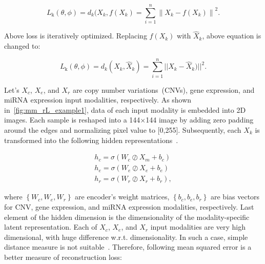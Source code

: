 \begin{equation}
    L_{\mathrm{k}}(\theta, \phi)=\text{$d_{k}$}(X_{k}, f(X_{k}) = \sum_{i=1}^{n} \left\|X_{k}-f(X_{k})\right\|^{2}.
\end{equation}

\hspace*{3.5mm} Above loss is iteratively optimized. Replacing $f(X_{k})$ with $\hat{X}_{k}$, above equation is changed to: 

\begin{equation}
    L_{\mathrm{k}}(\theta, \phi)=\text{$d_{k}$}(X_{k}, \hat{X}_{k}) = \sum_{i=1}^{n} ||X_{k}-\hat{X}_{k})||^{2}.
\end{equation}

\hspace*{3.5mm} Let's $X_c$, $X_e$, and $X_r$ are copy number variations~(CNVs), gene expression, and miRNA expression input modalities, respectively. As shown in~\cref{fig:mm_rL_example1}, data of each input modality is embedded into 2D images. Each sample is reshaped into a 144$\times$144 image by adding zero padding around the edges and normalizing pixel value to [0,255]. Subsequently, each $X_k$ is transformed into the following hidden representations~\cite{KarimIEEEAccess2019}.

\begin{equation}
    \begin{array}{l}
        {h_{c}=\sigma \left(W_{c} \oslash X_{m}+b_{c}\right)} \\
        {h_{e}=\sigma \left(W_{e} \oslash X_{e}+b_{e}\right)} \\
        {h_{r}=\sigma \left(W_{r} \oslash X_{r}+b_{r}\right),}
    \end{array}
\end{equation}  

\hspace*{3.5mm} where $\left\{W_{c}, W_{e}, W_{r}\right\}$ are encoder's weight matrices, $\left\{b_{c}, b_{e}, b_{r}\right\}$ are bias vectors for CNV, gene expression, and miRNA expression modalities, respectively. Last element of the hidden dimension is the dimensionality of the modality-specific latent representation. Each of $X_c$, $X_e$, and $X_r$ input modalities are very high dimensional, with huge difference w.r.t. dimensionality. In such a case, simple distance measure is not suitable~\cite{thiam2020multimodal}. Therefore, following mean squared error is a better measure of reconstruction loss:  

